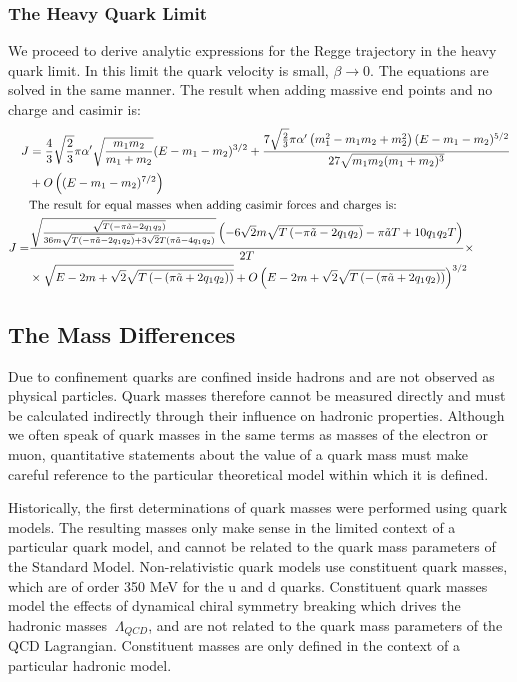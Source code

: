 \documentclass[11pt,a4paper]{article}
\begin{document}
\subsubsection{The Heavy Quark Limit}
We proceed to derive analytic expressions for the Regge trajectory in the heavy quark limit.
In this limit the quark velocity is small, $\beta\rightarrow0$. The equations are solved in the same manner. The result when adding massive end points and no charge and casimir is:
\begin{subequations}
\label{eq:reggeAnalyticHeavy}
\begin{align}
J&=\frac{4}{3}\sqrt{\frac{2}{3}}\pi\alpha'\sqrt{\frac{m_{1}m_{2}}{m_{1}+m_{2}}}(E-m_{1}-m_{2})^{3/2}+\frac{7\sqrt{\frac{2}{3}}\pi\alpha'\left(m_{1}^{2}-m_{1}m_{2}+m_{2}^{2}\right)(E-m_{1}-m_{2})^{5/2}}{27\sqrt{m_{1}m_{2}(m_{1}+m_{2})^{3}}}\notag\\
&+O\left((E-m_{1}-m_{2})^{7/2}\right)\\
&\text{The result for equal masses when adding casimir forces and charges is:}\notag\\
J=&
\frac{\sqrt{\frac{\sqrt{T \left(-\pi\tilde{a}-2 q_1q_2\right)}}{36 m \sqrt{T \left(-\pi\tilde{a}-2 q_1q_2\right)}+3 \sqrt{2} T \left(\pi\tilde{a}-4q_1q_2\right)}} \left(-6 \sqrt{2} m \sqrt{T \left(-\pi\tilde{a}-2 q_1q_2\right)}-\pi\tilde{a} T+10q_1q_2T\right)}{2 T}\times\notag\\ 
&\times\sqrt{E-2m+\sqrt{2}\sqrt{T\left(-\left(\pi\tilde{a}+2q_1q_2\right)\right)}}
+O\left(E-2m+\sqrt{2}\sqrt{T\left(-\left(\pi\tilde{a}+2q_1q_2\right)\right)}\right)^{3/2}
\end{align}
\end{subequations}
\FloatBarrier
\subsection{The Mass Differences}
\label{sec:massdiff}

\cite{PDGmassdif} Due to confinement quarks are confined inside hadrons and are not observed as physical particles. Quark masses therefore cannot be measured directly and must be calculated indirectly through their influence on hadronic properties. Although we often speak of quark masses in the same terms as masses of the electron or muon, quantitative statements about the value of a quark mass must make careful reference to the particular theoretical model within which it is defined.

Historically, the first determinations of quark masses were performed using quark models. The resulting masses only make sense in the limited context of a particular quark model, and cannot be related to the quark mass parameters of the Standard Model. Non-relativistic quark models use constituent quark masses, which are of order 350 MeV for the u and d quarks. Constituent quark masses model the effects of dynamical chiral symmetry breaking which drives the hadronic masses $~\Lambda_{QCD}$, and are not related to the quark mass parameters of the QCD Lagrangian. Constituent masses are only defined in the context of a particular hadronic model. 
\end{document}
